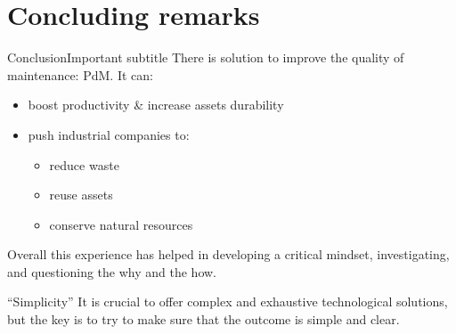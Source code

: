\section{Concluding remarks}
\SectionPage

\begin{frame}{Conclusion}{Important subtitle}
    There is solution to improve the quality of maintenance: \acl{PdM}.
    It can:
    \begin{itemize}
        \item boost productivity \& increase assets durability 
        \item push industrial companies to:
        \begin{itemize}
            \item reduce waste
            \item reuse assets
            \item conserve natural resources
        \end{itemize}
    \end{itemize}

    Overall this experience has helped in developing a critical mindset, investigating, and questioning the why and the how. 
    \begin{alertblock}{``Simplicity''} %
        It is crucial to offer complex and exhaustive technological solutions, but the \alert{key} is to try to make sure that the outcome is simple and clear. %
    \end{alertblock}
\end{frame}